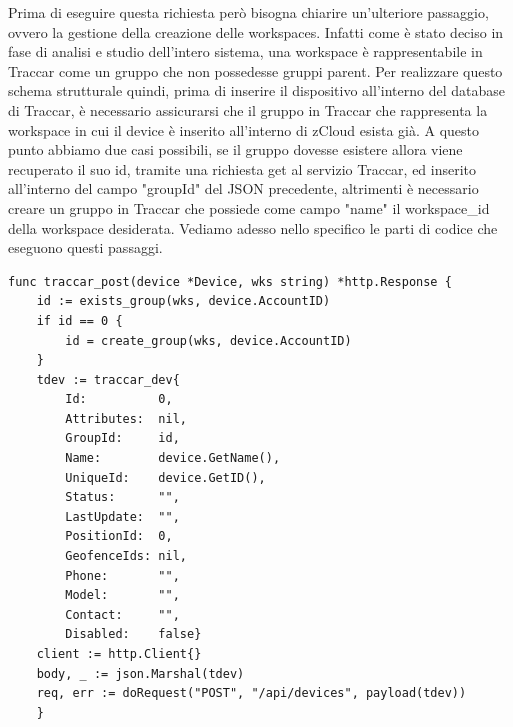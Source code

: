 \documentclass[a4paper,titlepage,12pt]{report}
\begin{document}
{\begin{verbatim}
\end{verbatim}

\noindent Prima di eseguire questa richiesta però bisogna chiarire un'ulteriore passaggio, ovvero la gestione della creazione delle workspaces. Infatti come è stato deciso in fase di analisi e studio dell'intero sistema, una workspace è rappresentabile in Traccar come un gruppo che non possedesse gruppi parent. Per realizzare questo schema strutturale quindi, prima di inserire il dispositivo all'interno del database di Traccar, è necessario assicurarsi che il gruppo in Traccar che rappresenta la workspace in cui il device è inserito all'interno di zCloud esista già. A questo punto abbiamo due casi possibili, se il gruppo dovesse esistere allora viene recuperato il suo id, tramite una richiesta get al servizio Traccar, ed inserito all'interno del campo "groupId" del JSON precedente, altrimenti è necessario creare un gruppo in Traccar che possiede come campo "name" il workspace\_id della workspace desiderata. Vediamo adesso nello specifico le parti di codice che eseguono questi passaggi.\\

\begin{verbatim}
func traccar_post(device *Device, wks string) *http.Response {
	id := exists_group(wks, device.AccountID)
	if id == 0 {
		id = create_group(wks, device.AccountID)
	}
    tdev := traccar_dev{
		Id:          0,
		Attributes:  nil,
		GroupId:     id,
		Name:        device.GetName(),
		UniqueId:    device.GetID(),
		Status:      "",
		LastUpdate:  "",
		PositionId:  0,
		GeofenceIds: nil,
		Phone:       "",
		Model:       "",
		Contact:     "",
		Disabled:    false}
	client := http.Client{}
	body, _ := json.Marshal(tdev)
	req, err := doRequest("POST", "/api/devices", payload(tdev))
	}
\end{verbatim}

}
\end{document}
